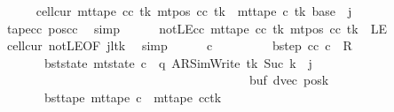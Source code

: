 \begin{isabellebody}
\ \ \ \ \isamarkupfalse%
\ cell{\isacharunderscore}{\kern0pt}cur{\isacharcolon}{\kern0pt}\ {\isachardoublequoteopen}mt{\isacharunderscore}{\kern0pt}tape\ cc\ tk\ {\isacharparenleft}{\kern0pt}mt{\isacharunderscore}{\kern0pt}pos\ cc\ tk{\isacharparenright}{\kern0pt}\ {\isacharequal}{\kern0pt}\ mt{\isacharunderscore}{\kern0pt}tape\ c{}\ tk\ {\isacharparenleft}{\kern0pt}base\ {\isacharplus}{\kern0pt}\ j{\isacharparenright}{\kern0pt}{\isachardoublequoteclose}\isanewline
\ \ \ \ \ \ \isamarkupfalse%
\ tape{\isacharunderscore}{\kern0pt}cc\ pos{\isacharunderscore}{\kern0pt}cc\ \isamarkupfalse%
\ simp\isanewline
\ \ \ \ \isamarkupfalse%
\ notLE{\isacharunderscore}{\kern0pt}cc{\isacharcolon}{\kern0pt}\ {\isachardoublequoteopen}mt{\isacharunderscore}{\kern0pt}tape\ cc\ tk\ {\isacharparenleft}{\kern0pt}mt{\isacharunderscore}{\kern0pt}pos\ cc\ tk{\isacharparenright}{\kern0pt}\ {\isasymnoteq}\ LE{}{\isachardoublequoteclose}\isanewline
\ \ \ \ \ \ \isamarkupfalse%
\ cell{\isacharunderscore}{\kern0pt}cur\ notLE{\isacharbrackleft}{\kern0pt}OF\ jltk{\isacharbrackright}{\kern0pt}\ \isamarkupfalse%
\ simp\isanewline
\ \ \ \ \isamarkupfalse%
\ c{\isacharprime}{\kern0pt}{\isacharprime}{\kern0pt}\ \isanewline
\ \ \ \ \ \ \ \ bstep{\isacharcolon}{\kern0pt}\ {\isachardoublequoteopen}{\isacharparenleft}{\kern0pt}cc{\isacharcomma}{\kern0pt}\ c{\isacharprime}{\kern0pt}{\isacharprime}{\kern0pt}{\isacharparenright}{\kern0pt}\ {\isasymin}\ R{\isacharprime}{\kern0pt}{\isachardoublequoteclose}\isanewline
\ \ \ \ \ \ \ bst{\isacharunderscore}{\kern0pt}state{\isacharcolon}{\kern0pt}\ {\isachardoublequoteopen}mt{\isacharunderscore}{\kern0pt}state\ c{\isacharprime}{\kern0pt}{\isacharprime}{\kern0pt}\ {\isacharequal}{\kern0pt}\ {\isacharparenleft}{\kern0pt}q{\isacharcomma}{\kern0pt}\ AR{\isacharunderscore}{\kern0pt}SimWrite{\isacharcomma}{\kern0pt}\ tk{\isacharcomma}{\kern0pt}\ Suc\ {\isacharparenleft}{\kern0pt}{\isacharquery}{\kern0pt}k\ {\isacharplus}{\kern0pt}\ j{\isacharparenright}{\kern0pt}{\isacharcomma}{\kern0pt}\isanewline
\ \ \ \ \ \ \ \ \ \ \ \ \ \ \ \ \ \ \ \ \ \ \ \ \ \ \ \ \ \ \ \ \ \ \ \ \ \ \ \ buf{\isacharcomma}{\kern0pt}\ dvec{\isacharcomma}{\kern0pt}\ posk{\isacharparenright}{\kern0pt}{\isachardoublequoteclose}\isanewline
\ \ \ \ \ \ \ bst{\isacharunderscore}{\kern0pt}tape{\isacharcolon}{\kern0pt}\ {\isachardoublequoteopen}mt{\isacharunderscore}{\kern0pt}tape\ c{\isacharprime}{\kern0pt}{\isacharprime}{\kern0pt}\ {\isacharequal}{\kern0pt}\ {\isacharparenleft}{\kern0pt}mt{\isacharunderscore}{\kern0pt}tape\ cc{\isacharparenright}{\kern0pt}{\isacharparenleft}{\kern0pt}tk\ {\isacharcolon}{\kern0pt}{\isacharequal}{\kern0pt}\isanewline

\end{isabellebody}
